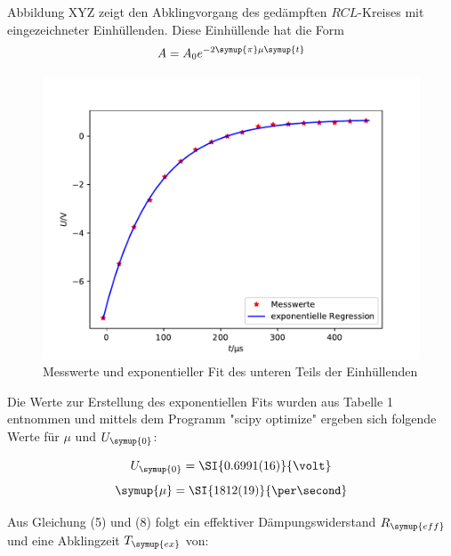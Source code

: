 Abbildung XYZ zeigt den Abklingvorgang des gedämpften $RCL$-Kreises mit eingezeichneter
Einhüllenden. Diese Einhüllende hat die Form
\begin{equation}
  A = A_0e^{-2\symup{\pi}\mu\symup{t}}
\end{equation}

\begin{figure}
   \centering
   \includegraphics[scale = 0.5]{plotA1.pdf}
   \caption{Messwerte und exponentieller Fit des  unteren Teils der Einhüllenden}
   \label{Abb:7}
 \end{figure}


Die Werte zur Erstellung des exponentiellen Fits wurden aus Tabelle 1 entnommen und mittels dem Programm
"scipy optimize" ergeben sich folgende Werte für $\mu$ und $U_\symup{0}$:

\begin{equation}
  U_\symup{0} = \SI{0.6991(16)}{\volt}
\end{equation}
\begin{equation}
  \symup{\mu} = \SI{1812(19)}{\per\second}
\end{equation}

Aus Gleichung (5) und (8) folgt ein effektiver Dämpungswiderstand $R_\symup{eff}$ und eine Abklingzeit $T_\symup{ex}$ von:

